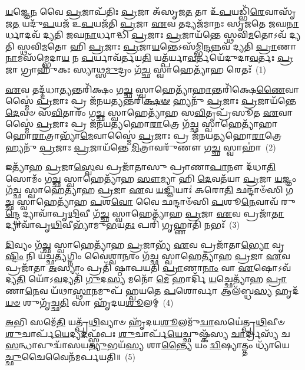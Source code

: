 \setcounter{anuvakam}{0}
\-\ul{𑌯}\-𑌜𑍍𑌞𑍇\-\ul{𑌨} 𑌵𑍈 \ul{𑌪𑍍𑌰}\-𑌜𑌾𑌪᳴𑌤𑌿𑌃 \ul{𑌪𑍍𑌰}\-𑌜𑌾 𑌅᳴𑌸𑍃𑌜\-\ul{𑌤} 𑌤𑌾 𑌉᳴\-\ul{𑌪}\-𑌯𑌡𑍍𑌭𑌿᳴\-\ul{𑌰𑍇}\-𑌵𑌾𑌸𑍃᳴𑌜\-\ul{𑌤} 𑌯𑌦𑍁᳴\-\ul{𑌪}\-𑌯𑌜᳴ 𑌉\-\ul{𑌪}\-𑌯𑌜᳴𑌤𑌿 \ul{𑌪𑍍𑌰}\-𑌜𑌾 \ul{𑌏}\-𑌵 𑌤𑌦𑍍𑌯𑌜᳴𑌮𑌾𑌨𑌃 𑌸𑍃𑌜𑌤𑍇 𑌜𑌘\-\ul{𑌨𑌾}\-𑌰𑍍𑌧𑌾𑌦𑌵᳴ 𑌦𑍍𑌯𑌤𑌿 𑌜𑌘\-\ul{𑌨𑌾}\-𑌰𑍍𑌧𑌾𑌦𑍍𑌧𑌿 \ul{𑌪𑍍𑌰}\-𑌜𑌾𑌃 \ul{𑌪𑍍𑌰}\-𑌜𑌾𑌯᳴𑌨𑍍𑌤𑍇 𑌸𑍍𑌥𑌵𑌿\-\ul{𑌮}\-𑌤𑍋\-𑌽𑌵᳴ 𑌦𑍍𑌯𑌤𑌿 𑌸𑍍𑌥𑌵𑌿\-\ul{𑌮}\-𑌤𑍋 𑌹𑌿 \ul{𑌪𑍍𑌰}\-𑌜𑌾𑌃 \ul{𑌪𑍍𑌰}\-𑌜𑌾\-\ul{𑌯}\-𑌨𑍍𑌤𑍇\-𑌽𑌸᳴𑌮𑍍𑌭𑌿\-\ul{𑌨𑍍𑌦}\-𑌨𑍍𑌨𑌵᳴ 𑌦𑍍𑌯𑌤𑌿 \ul{𑌪𑍍𑌰𑌾}\-𑌣𑌾\-\ul{𑌨𑌾}\-𑌮𑌸᳴𑌮𑍍𑌭𑍇𑌦𑌾\-\ul{𑌯} 𑌨 \ul{𑌪}\-𑌰𑍍𑌯𑌾𑌵᳴𑌰𑍍𑌤𑌯\-\ul{𑌤𑌿} 𑌯𑌤𑍍𑌪᳴𑌰𑍍𑌯𑌾\-\ul{𑌵}\-𑌰𑍍𑌤𑌯𑍇᳴𑌦𑍁𑌦𑌾\-\ul{𑌵}\-𑌰𑍍𑌤𑌃 \ul{𑌪𑍍𑌰}\-𑌜𑌾 𑌗𑍍𑌰𑌾𑌹𑍁᳴𑌕𑌃 𑌸𑍍𑌯𑌾𑌥𑍍𑌸\-\ul{𑌮𑍁}\-𑌦𑍍𑌰𑌂 𑌗᳴\-\ul{𑌚𑍍𑌛} 𑌸𑍍𑌵𑌾𑌹𑍇𑌤𑍍𑌯𑌾᳴𑌹 𑌰𑍇𑌤𑌃᳴~(1)

\-\ul{𑌏}\-𑌵 𑌤𑌦𑍍𑌦᳴𑌧𑌾\-\ul{𑌤𑍍𑌯}\-𑌨𑍍𑌤𑌰𑌿᳴𑌕𑍍𑌷𑌂 𑌗\-\ul{𑌚𑍍𑌛} 𑌸𑍍𑌵𑌾𑌹𑍇𑌤𑍍𑌯𑌾᳴\-\ul{𑌹𑌾}\-𑌨𑍍𑌤𑌰𑌿᳴𑌕𑍍𑌷𑍇\-\ul{𑌣𑍈}\-𑌵𑌾𑌸𑍍𑌮𑍈॑ \ul{𑌪𑍍𑌰}\-𑌜𑌾𑌃 𑌪𑍍𑌰 𑌜᳴𑌨𑌯\-\ul{𑌤𑍍𑌯}\-𑌨𑍍𑌤𑌰𑌿᳴\-\ul{𑌕𑍍𑌷}\-\-\ul{𑍟} 𑌹𑍍𑌯𑌨𑍁᳴ \ul{𑌪𑍍𑌰}\-𑌜𑌾𑌃 \ul{𑌪𑍍𑌰}\-𑌜𑌾𑌯᳴𑌨𑍍𑌤𑍇 \ul{𑌦𑍇}\-𑌵𑍞 𑌸᳴\-\ul{𑌵𑌿}\-𑌤𑌾𑌰𑌂᳴ 𑌗\-\ul{𑌚𑍍𑌛} 𑌸𑍍𑌵𑌾𑌹𑍇𑌤𑍍𑌯𑌾᳴𑌹 𑌸\-\ul{𑌵𑌿}\-𑌤𑍃𑌪𑍍𑌰᳴𑌸𑍂𑌤 \ul{𑌏}\-𑌵𑌾𑌸𑍍𑌮𑍈॑ \ul{𑌪𑍍𑌰}\-𑌜𑌾𑌃 𑌪𑍍𑌰 𑌜᳴𑌨𑌯𑌤𑍍𑌯𑌹𑍋\-\ul{𑌰𑌾}\-𑌤𑍍𑌰𑍇 𑌗᳴\-\ul{𑌚𑍍𑌛} 𑌸𑍍𑌵𑌾𑌹𑍇𑌤𑍍𑌯𑌾᳴𑌹𑌾𑌹𑍋\-\ul{𑌰𑌾}\-𑌤𑍍𑌰𑌾𑌭𑍍𑌯𑌾᳴\-\ul{𑌮𑍇}\-𑌵𑌾𑌸𑍍𑌮𑍈॑ \ul{𑌪𑍍𑌰}\-𑌜𑌾𑌃 𑌪𑍍𑌰 𑌜᳴𑌨𑌯𑌤𑍍𑌯𑌹𑍋\-\ul{𑌰𑌾}\-𑌤𑍍𑌰𑍇 𑌹𑍍𑌯𑌨𑍁᳴ \ul{𑌪𑍍𑌰}\-𑌜𑌾𑌃 \ul{𑌪𑍍𑌰}\-𑌜𑌾𑌯᳴𑌨𑍍𑌤𑍇 \ul{𑌮𑌿}\-𑌤𑍍𑌰𑌾𑌵𑌰𑍁᳴𑌣𑍗 𑌗\-\ul{𑌚𑍍𑌛} 𑌸𑍍𑌵𑌾𑌹𑌾॑~(2)

𑌇𑌤𑍍𑌯𑌾᳴𑌹 \ul{𑌪𑍍𑌰}\-𑌜𑌾\-\ul{𑌸𑍍𑌵𑍇}\-𑌵 𑌪𑍍𑌰𑌜𑌾᳴𑌤𑌾𑌸𑍁 𑌪𑍍𑌰𑌾𑌣𑌾\-\ul{𑌪𑌾}\-𑌨𑍗 𑌦᳴𑌧𑌾\-\ul{𑌤𑌿} 𑌸𑍋𑌮𑌂᳴ 𑌗\-\ul{𑌚𑍍𑌛} 𑌸𑍍𑌵𑌾𑌹𑍇𑌤𑍍𑌯𑌾᳴𑌹 \ul{𑌸𑍗}\-𑌮𑍍𑌯𑌾 𑌹𑌿 \ul{𑌦𑍇}\-𑌵𑌤᳴𑌯𑌾 \ul{𑌪𑍍𑌰}\-𑌜𑌾 \ul{𑌯}\-𑌜𑍍𑌞𑌂 𑌗᳴\-\ul{𑌚𑍍𑌛} 𑌸𑍍𑌵𑌾𑌹𑍇𑌤𑍍𑌯𑌾᳴𑌹 \ul{𑌪𑍍𑌰}\-𑌜𑌾 \ul{𑌏}\-𑌵 \ul{𑌯}\-𑌜𑍍𑌞𑌿𑌯𑌾𑌃॑ 𑌕𑌰𑍋\-\ul{𑌤𑌿} 𑌛𑌨𑍍𑌦𑌾𑍞᳴𑌸𑌿 𑌗\-\ul{𑌚𑍍𑌛} 𑌸𑍍𑌵𑌾𑌹𑍇𑌤𑍍𑌯𑌾᳴𑌹 \ul{𑌪}\-𑌶\-\ul{𑌵𑍋} 𑌵𑍈 𑌛𑌨𑍍𑌦𑌾𑍞᳴𑌸𑌿 \ul{𑌪}\-𑌶𑍂\-\ul{𑌨𑍇}\-𑌵𑌾𑌵᳴ 𑌰𑍁\-\ul{𑌨𑍍𑌦𑍍𑌧𑍇} 𑌦𑍍𑌯𑌾𑌵𑌾᳴𑌪𑍃\-\ul{𑌥𑌿}\-𑌵𑍀 𑌗᳴\-\ul{𑌚𑍍𑌛} 𑌸𑍍𑌵𑌾𑌹𑍇𑌤𑍍𑌯𑌾᳴𑌹 \ul{𑌪𑍍𑌰}\-𑌜𑌾 \ul{𑌏}\-𑌵 𑌪𑍍𑌰𑌜𑌾᳴\-\ul{𑌤𑌾} 𑌦𑍍𑌯𑌾𑌵𑌾᳴𑌪𑍃\-\ul{𑌥𑌿}\-𑌵𑍀𑌭𑍍𑌯𑌾᳴𑌮𑍁\-\ul{𑌭}\-𑌯\-\ul{𑌤𑌃} 𑌪𑌰𑌿᳴ 𑌗𑍃𑌹𑍍𑌣𑌾𑌤𑌿 𑌨𑌭𑌃᳴~(3)

\-\ul{𑌦𑌿}\-𑌵𑍍𑌯𑌂 𑌗᳴\-\ul{𑌚𑍍𑌛} 𑌸𑍍𑌵𑌾𑌹𑍇𑌤𑍍𑌯𑌾᳴𑌹 \ul{𑌪𑍍𑌰}\-𑌜𑌾𑌭𑍍𑌯᳴ \ul{𑌏}\-𑌵 𑌪𑍍𑌰𑌜𑌾᳴𑌤𑌾\-\ul{𑌭𑍍𑌯𑍋} 𑌵𑍃\-\ul{𑌷𑍍𑌟𑌿𑌂} 𑌨𑌿 𑌯᳴𑌚𑍍𑌛\-\ul{𑌤𑍍𑌯}\-𑌗𑍍𑌨𑌿𑌂 𑌵𑍈॑𑌶𑍍𑌵𑌾\-\ul{𑌨}\-𑌰𑌂 𑌗᳴\-\ul{𑌚𑍍𑌛} 𑌸𑍍𑌵𑌾𑌹𑍇𑌤𑍍𑌯𑌾᳴𑌹 \ul{𑌪𑍍𑌰}\-𑌜𑌾 \ul{𑌏}\-𑌵 𑌪𑍍𑌰𑌜𑌾᳴𑌤𑌾 \ul{𑌅}\-𑌸𑍍𑌯𑌾𑌂 𑌪𑍍𑌰𑌤𑌿᳴ 𑌷𑍍𑌠𑌾𑌪𑌯𑌤𑌿 \ul{𑌪𑍍𑌰𑌾}\-𑌣𑌾\-\ul{𑌨𑌾𑌂} 𑌵𑌾 \ul{𑌏}\-𑌷𑍋\-𑌽𑌵᳴ 𑌦𑍍𑌯\-\ul{𑌤𑌿} 𑌯𑍋᳴\-𑌽\-\ul{𑌵}\-𑌦𑍍𑌯𑌤𑌿᳴ \ul{𑌗𑍁}\-𑌦\-\ul{𑌸𑍍𑌯} 𑌮𑌨𑍋᳴ \ul{𑌮𑍇} 𑌹𑌾𑌰𑍍𑌦𑌿᳴ \ul{𑌯}\-𑌚𑍍𑌛𑍇𑌤𑍍𑌯𑌾᳴𑌹 \ul{𑌪𑍍𑌰𑌾}\-𑌣𑌾\-\ul{𑌨𑍇}\-𑌵 𑌯᳴𑌥𑌾\-\ul{𑌸𑍍𑌥𑌾}\-𑌨𑌮𑍁𑌪᳴ 𑌹𑍍𑌵𑌯𑌤𑍇 \ul{𑌪}\-𑌶𑍋𑌰𑍍𑌵𑌾 𑌆𑌲᳴𑌬𑍍𑌧\-\ul{𑌸𑍍𑌯} 𑌹𑍃𑌦᳴\-\ul{𑌯}\-\-\ul{𑍞} 𑌶𑍁𑌗𑍃᳴𑌚𑍍𑌛\-\ul{𑌤𑌿} 𑌸𑌾 𑌹𑍃᳴𑌦𑌯\-\ul{𑌶𑍂}\-𑌲𑌮𑍍~(4)

\-\ul{𑌅}\-𑌭𑌿 𑌸𑌮𑍇᳴\-\ul{𑌤𑌿} 𑌯𑌤𑍍𑌪𑍃᳴\-\ul{𑌥𑌿}\-𑌵𑍍𑌯𑌾𑍞 𑌹𑍃᳴𑌦𑌯\-\ul{𑌶𑍂}\-𑌲𑌮𑍁᳴\-\ul{𑌦𑍍𑌵𑌾}\-𑌸𑌯𑍇॑𑌤𑍍𑌪𑍃\-\ul{𑌥𑌿}\-𑌵𑍀𑍞 \ul{𑌶𑍁}\-𑌚𑌾𑌰𑍍𑌪᳴\-\ul{𑌯𑍇}\-𑌦𑍍𑌯\-\ul{𑌦}\-𑌫𑍍𑌸𑍍𑌵᳴𑌪𑌃 \ul{𑌶𑍁}\-𑌚𑌾𑌰𑍍𑌪᳴\-\ul{𑌯𑍇}\-𑌚𑍍𑌛𑍁𑌷𑍍𑌕᳴𑌸𑍍𑌯 \ul{𑌚𑌾}\-𑌰𑍍𑌦𑍍𑌰𑌸𑍍𑌯᳴ 𑌚 \ul{𑌸}\-𑌨𑍍𑌧𑌾𑌵𑍁𑌦𑍍𑌵𑌾᳴𑌸𑌯\-\ul{𑌤𑍍𑌯𑍁}\-𑌭𑌯᳴\-\ul{𑌸𑍍𑌯} 𑌶𑌾\-\ul{𑌨𑍍𑌤𑍍𑌯𑍈} 𑌯𑌂 \ul{𑌦𑍍𑌵𑌿}\-𑌷𑍍𑌯𑌾𑌤𑍍𑌤𑌂 𑌧𑍍𑌯𑌾᳴𑌯𑍇\-\ul{𑌚𑍍𑌛𑍁}\-𑌚𑍈𑌵𑍈𑌨᳴𑌮𑌰𑍍𑌪𑌯𑌤𑌿॥~(5)

